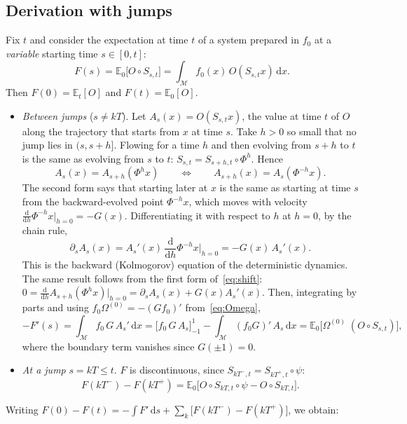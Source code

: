 \documentclass[11pt,a4paper]{article}
\theoremstyle{remark}
\newcommand{\E}{\mathbb{E}}
\newcommand{\M}{\mathcal{M}}
\newcommand{\dd}{\mathrm{d}}
\begin{document}
\subsection{Derivation with jumps}
Fix $t$ and consider the expectation at time $t$ of a system prepared in $f_0$
at a \emph{variable} starting time $s\in[0,t]$:
\begin{equation}
  F(s) = \E_0\big[O\circ S_{s,t}\big] = \int_\M f_0(x)\,O(S_{s,t}x)\,\dd x .
\end{equation}
Then $F(0)=\E_t[O]$ and $F(t)=\E_0[O]$.
\begin{itemize}
\item \emph{Between jumps} ($s\neq kT$). Let $A_s(x)=O(S_{s,t}x)$, the value
  at time $t$ of $O$ along the trajectory that starts from $x$ at time $s$.
  Take $h>0$ so small that no jump lies in $(s,s+h]$. Flowing for a time $h$
  and then evolving from $s+h$ to $t$ is the same as evolving from $s$ to
  $t$: $S_{s,t}=S_{s+h,t}\circ\Phi^h$. Hence
  \begin{equation}\label{eq:shift}
    A_s(x) = A_{s+h}(\Phi^h x)
    \qquad\Longleftrightarrow\qquad
    A_{s+h}(x) = A_s(\Phi^{-h}x).
  \end{equation}
  The second form says that starting later at $x$ is the same as starting
  at time $s$ from the backward-evolved point $\Phi^{-h}x$, which moves with
  velocity $\frac{\dd}{\dd h}\Phi^{-h}x\big|_{h=0}=-G(x)$. Differentiating it
  with respect to $h$ at $h=0$, by the chain rule,
  \begin{equation}\label{eq:backward}
    \partial_s A_s(x) = A_s'(x)\,\frac{\dd}{\dd h}\Phi^{-h}x\Big|_{h=0}
    = -G(x)\,A_s'(x).
  \end{equation}
  This is the backward (Kolmogorov) equation of the deterministic dynamics.
  The same result follows from the first form of~\eqref{eq:shift}:
  $0=\frac{\dd}{\dd h}A_{s+h}(\Phi^hx)\big|_{h=0}=\partial_sA_s(x)+G(x)A_s'(x)$.
  Then, integrating by parts and using $f_0\Omega^{(0)}=-(Gf_0)'$
  from~\eqref{eq:Omega},
  \begin{equation}
    -F'(s) = \int_\M f_0\,G\,A_s'\,\dd x
    = \Big[f_0\,G\,A_s\Big]_{-1}^{1} - \int_\M (f_0G)'\,A_s\,\dd x
    = \E_0\big[\Omega^{(0)}\;(O\circ S_{s,t})\big],
  \end{equation}
  where the boundary term vanishes since $G(\pm1)=0$.
\item \emph{At a jump} $s=kT\le t$. $F$ is discontinuous, since
  $S_{kT^-,t}=S_{kT^+,t}\circ\psi$:
  \begin{equation}
    F(kT^-)-F(kT^+) = \E_0\big[O\circ S_{kT,t}\circ\psi - O\circ S_{kT,t}\big].
  \end{equation}
\end{itemize}
Writing $F(0)-F(t)=-\int F'\,\dd s+\sum_k\big[F(kT^-)-F(kT^+)\big]$, we obtain:
\end{document}

